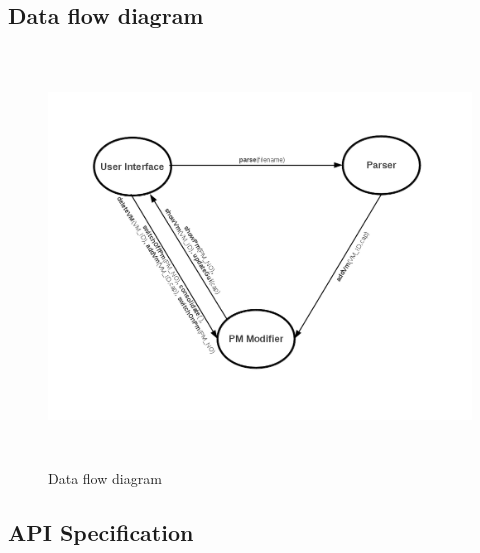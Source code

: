 \documentclass[a4paper,11pt]{article}
\begin{document}
\pagebreak
\subsection{Data flow diagram}

\begin{figure}[h]
\centering
\includegraphics[height=11cm]{images/dfd.png}
\caption{Data flow diagram}
\label{fig:modules}

\end{figure}




\subsection{API Specification}
\end{document}
